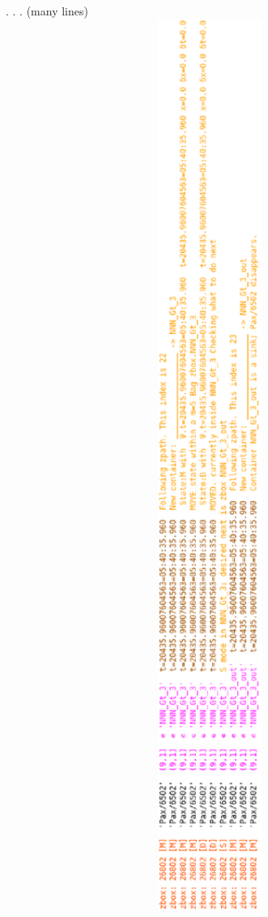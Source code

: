 \vspace{0.1cm}\\
. . . (many lines)\\
\includegraphics[angle=270,width=16cm]{70_figs/Pax_6502b.eps}\\
\vspace{0.5cm}

